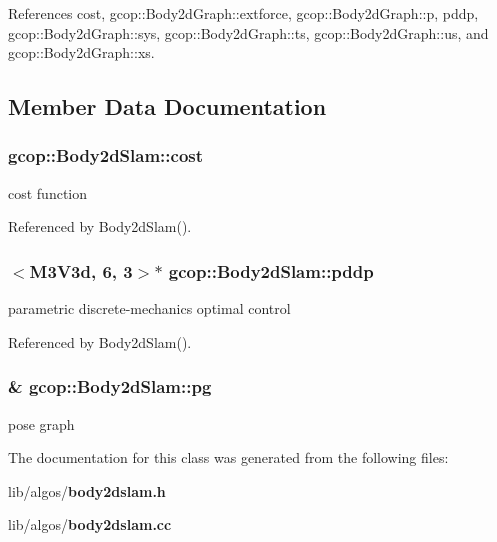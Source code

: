 \-References cost, gcop\-::\-Body2d\-Graph\-::extforce, gcop\-::\-Body2d\-Graph\-::p, pddp, gcop\-::\-Body2d\-Graph\-::sys, gcop\-::\-Body2d\-Graph\-::ts, gcop\-::\-Body2d\-Graph\-::us, and gcop\-::\-Body2d\-Graph\-::xs.



\subsection{\-Member \-Data \-Documentation}
\subsubsection[{cost}]{ {\bf gcop\-::\-Body2d\-Slam\-::cost}}\label{classgcop_1_1Body2dSlam_acab19d706b92f18ce21294389e0a95aa}


cost function 



\-Referenced by \-Body2d\-Slam().

\subsubsection[{pddp}]{$<${\bf \-M3\-V3d}, 6, 3$>$$\ast$ {\bf gcop\-::\-Body2d\-Slam\-::pddp}}\label{classgcop_1_1Body2dSlam_a7a141c2b7c30386fe950a22a042f02c3}


parametric discrete-\/mechanics optimal control 



\-Referenced by \-Body2d\-Slam().

\subsubsection[{pg}]{\& {\bf gcop\-::\-Body2d\-Slam\-::pg}}\label{classgcop_1_1Body2dSlam_aa1df4210bd9e78cb39c08b42de3928e1}


pose graph 



\-The documentation for this class was generated from the following files\-:\begin{DoxyCompactItemize}
\item 
lib/algos/{\bf body2dslam.\-h}\item 
lib/algos/{\bf body2dslam.\-cc}\end{DoxyCompactItemize}
